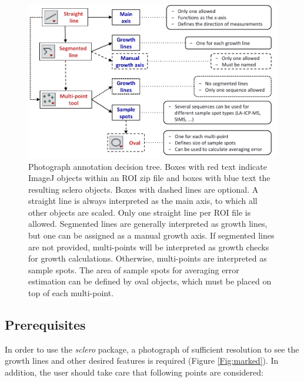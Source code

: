 \documentclass[11pt, a4paper]{article}
\newcommand{\sclero}{\textit{sclero}\xspace}
\begin{document}
\begin{figure}[H]
\includegraphics[width=1\textwidth]{sclero_decision_schematic.pdf}
\caption{Photograph annotation decision tree. Boxes with red text indicate ImageJ objects within an ROI zip file and boxes with blue text the resulting sclero objects. Boxes with dashed lines are optional. A straight line is always interpreted as the main axis, to which all other objects are scaled. Only one straight line per ROI file is allowed. Segmented lines are generally interpreted as growth lines, but one can be assigned as a manual growth axis. If segmented lines are not provided, multi-points will be interpreted as growth checks for growth calculations. Otherwise, multi-points are interpreted as sample spots. The area of sample spots for averaging error estimation can be defined by oval objects, which must be placed on top of each multi-point.}
\label{Fig:decisionTree}
\end{figure}

\subsection{Prerequisites}

In order to use the \sclero package, a photograph of sufficient resolution to see the growth lines and other desired features is required (Figure \ref{Fig:marked}). In addition, the user should take care that following points are considered:
\end{document}
